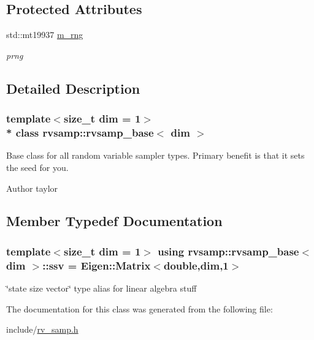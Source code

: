 \subsection*{Protected Attributes}
\begin{DoxyCompactItemize}
\item 
std\+::mt19937 \hyperlink{classrvsamp_1_1rvsamp__base_a9de1854b5750fbb30709b71a33bfffb9}{m\+\_\+rng}\hypertarget{classrvsamp_1_1rvsamp__base_a9de1854b5750fbb30709b71a33bfffb9}{}\label{classrvsamp_1_1rvsamp__base_a9de1854b5750fbb30709b71a33bfffb9}

\begin{DoxyCompactList}\small\item\em prng \end{DoxyCompactList}\end{DoxyCompactItemize}


\subsection{Detailed Description}
\subsubsection*{template$<$size\+\_\+t dim = 1$>$\\*
class rvsamp\+::rvsamp\+\_\+base$<$ dim $>$}

Base class for all random variable sampler types. Primary benefit is that it sets the seed for you. 

\begin{DoxyAuthor}{Author}
taylor 
\end{DoxyAuthor}


\subsection{Member Typedef Documentation}
\subsubsection[{\texorpdfstring{ssv}{ssv}}]{\setlength{\rightskip}{0pt plus 5cm}template$<$size\+\_\+t dim = 1$>$ using {\bf rvsamp\+::rvsamp\+\_\+base}$<$ dim $>$\+::{\bf ssv} =  Eigen\+::\+Matrix$<$double,dim,1$>$}\hypertarget{classrvsamp_1_1rvsamp__base_a97f71542c6f1cd3bdf885039d5883580}{}\label{classrvsamp_1_1rvsamp__base_a97f71542c6f1cd3bdf885039d5883580}
\char`\"{}state size vector\char`\"{} type alias for linear algebra stuff 

The documentation for this class was generated from the following file\+:\begin{DoxyCompactItemize}
\item 
include/\hyperlink{rv__samp_8h}{rv\+\_\+samp.\+h}\end{DoxyCompactItemize}
